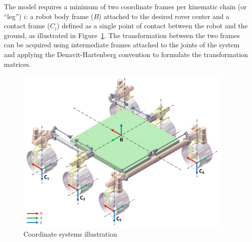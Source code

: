 \documentclass[a4paper,twocolumn]{esapub2005} %
\begin{document}
The model requires a minimum of two coordinate frames per kinematic chain (or 
``leg'') $i$: a robot body frame ($B$) attached to the desired rover center and 
a contact frame ($C_{i}$) defined as a single point of contact between the 
robot and the ground, as illustrated in Figure~\ref{fig:CoosWW}. The 
transformation between the two frames can be acquired using 
intermediate frames attached to the joints of the system and applying the 
Denavit-Hartenberg convention to formulate the transformation matrices.

\begin{figure}[b!]
	\centering
	\includegraphics[width=0.95\textwidth]{coordsystems.png}
	\caption{Coordinate systems illustration}
	\label{fig:CoosWW}
\end{figure}
\end{document}
